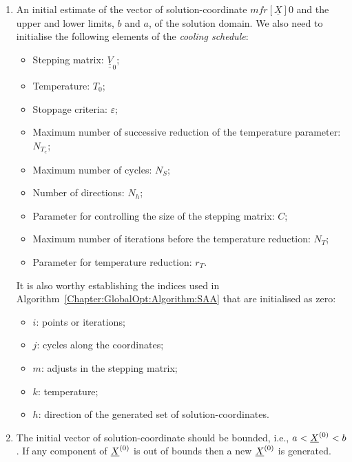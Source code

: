 \begin{enumerate}[{\bf Step 1: }]
   \item\label{Step1} An initial estimate of the vector of solution-coordinate $mfr[\underline{X}]{}{0}$ and the upper and lower limits, $b$ and $a$, of the solution domain.  We also need to initialise the following elements of the {\it cooling schedule}:
   \begin{itemize}
      \item Stepping matrix: $\underline{\underline{V}}_{0}$;
      \item Temperature: $T_{0}$;
      \item Stoppage criteria: $\varepsilon$;
      \item Maximum number of successive reduction of the temperature parameter: $N_{T_{e}}$;
      \item Maximum number of cycles: $N_{S}$;
      \item Number of directions: $N_{h}$;
      \item Parameter for controlling the size of the stepping matrix: $C$;
      \item Maximum number of iterations before the temperature reduction: $N_{T}$;
      \item Parameter for temperature reduction: $r_{T}$.
   \end{itemize}
   It is also worthy establishing the indices used in Algorithm~\ref{Chapter:GlobalOpt:Algorithm:SAA} that are initialised as zero:
   \begin{itemize}
      \item $i$: points or iterations;
      \item $j$: cycles along the coordinates;
      \item $m$: adjusts in the stepping matrix;
      \item $k$: temperature;
      \item $h$: direction of the generated set of solution-coordinates.
   \end{itemize}

   \item\label{Step2} The initial vector of solution-coordinate should be bounded, i.e., $a <\mfr[\underline{X}]{}{0}< b$. If any component of $\mfr[\underline{X}]{}{0}$ is out of bounds then a new $\mfr[\underline{X}]{}{0}$ is generated.


\end{enumerate}
